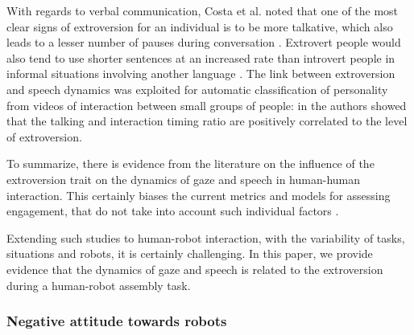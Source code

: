 \documentclass[twocolumn]{svjour3}          %
\begin{document}
With regards to verbal communication, Costa et al. \cite{NEOPIR1998} noted that one of the most clear signs of extroversion for an individual is to be more talkative, which also leads to a lesser number of pauses during conversation \cite{Scherer1981}. Extrovert people would also tend to use shorter sentences at an increased rate than introvert people in informal situations involving another language \cite{Dewaele00}. 
The link between extroversion and speech dynamics was exploited for automatic classification of personality from videos of interaction between small groups of people: in \cite{Pianesi08,Lepri2010} the authors showed that the talking and interaction timing ratio are positively correlated to the level of extroversion.

To summarize, there is evidence from the literature on the influence of the extroversion trait on the dynamics of gaze and speech in human-human interaction. This certainly biases the current metrics and models for assessing engagement, that do not take into account such individual factors \cite{Anzalone2015engagement,rich2010recognizing}. 

Extending such studies to human-robot interaction, with the variability of tasks, situations and robots, it is certainly challenging. In this paper, we provide evidence that the dynamics of gaze and speech is related to the extroversion during a human-robot assembly task.





\subsubsection{Negative attitude towards robots}
\end{document}
